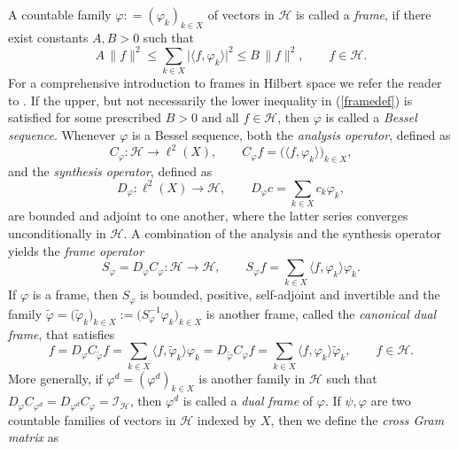 \documentclass{amsart}
\def\Hil{\mathcal{H}}
\renewcommand{\H}{{\mathcal{H}}}
\begin{document}
A countable family $\varphi : = (\varphi_k )_{k \in X}$ of vectors in %
$\H$ is called a \emph{frame}, %
if there exist constants $A,B>0$ such that 
\begin{equation}\label{framedef}
A \, \| f \|^2 \leq
  \sum_{k\in X} \vert \langle f  ,  \varphi_k \rangle \vert^2 \leq
  B \, \| f \|^2, \qquad  f\in\Hil.
\end{equation} 
  For a comprehensive introduction to frames in Hilbert space we refer the reader to \cite{ole1n}.
If the upper, but not necessarily the lower inequality in (\ref{framedef}) is satisfied for some prescribed $B>0$ and all $f\in \Hil$, then $\varphi$ is called a \emph{Bessel sequence}. Whenever $\varphi$ is a Bessel sequence, both the \emph{analysis operator}, defined as
\begin{equation*}
C_{\varphi} : \H \rightarrow  \ell^2(X) ,\qquad C_\varphi f= \big(\langle f   ,   \varphi_k \rangle\big)_{k \in X},
\label{eq:Analysenoperator}
\end{equation*}  
and the \emph{synthesis operator}, defined as
\begin{equation*}
D_\varphi : \ell^2(X) \rightarrow \H ,\qquad D_\varphi c =  \sum_{k \in X} c_k \varphi_k,
\label{eq:Synthesenoperator}
\end{equation*}
are bounded and adjoint to one another, where the latter series converges unconditionally in $\Hil$. A combination of the analysis and the synthesis operator yields the \emph{frame operator}
\begin{equation*}
S_\varphi  = D_\varphi C_\varphi: \H \rightarrow \H ,\qquad S_\varphi f = \sum_{k \in X} \langle f   ,   \varphi_k \rangle  \varphi_k.
\label{eq:Rahmenoperator}
\end{equation*}
If $\varphi$ is a frame, then $S_\varphi$ is bounded, positive, self-adjoint and invertible and the family $\widetilde{\varphi}=\big(\widetilde{\varphi}_k \big)_{k \in X} :=\big( S_{\varphi}^{-1} \varphi_k \big)_{k \in X}$ is another frame, called  the \emph{canonical dual frame}, that satisfies 
\begin{equation}\label{framerec}
f=D_\varphi C_{\widetilde{\varphi}}f=\sum_{k \in X} \langle f   ,   \widetilde{\varphi}_k \rangle  \varphi_k=D_{\widetilde{\varphi}}C_\varphi f=\sum_{k \in X} \langle f   ,   \varphi_k \rangle  \widetilde{\varphi}_k, \qquad  f\in \Hil.
\end{equation}
More generally, if $\varphi^d = (\varphi^d)_{k\in X}$ is another family in $\Hil$ such that $D_\varphi C_{\varphi^d} = D_{\varphi^d} C_{\varphi} = \mathcal{I}_{\Hil}$, then $\varphi^d$ is called a \emph{dual frame} of $\varphi$. If $\psi,\varphi$ are two countable families of vectors in $\H$ indexed by $X$, then we define the \emph{cross Gram matrix} as
\end{document}
